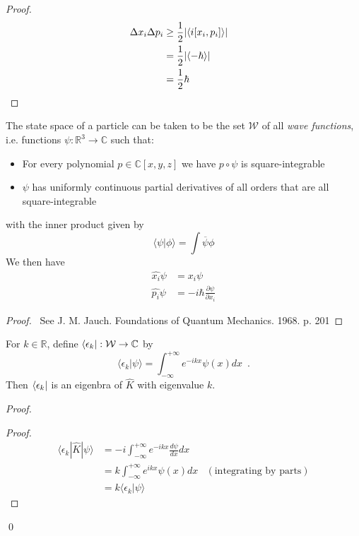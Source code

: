 \begin{proof}
\pf
\begin{align*}
\Delta x_i \Delta p_i & \geq \frac{1}{2} |\langle i [x_i, p_i] \rangle| \\
& = \frac{1}{2} |\langle - \hbar \rangle| \\
& = \frac{1}{2} \hbar & \qed
\end{align*}
\end{proof}

\begin{thm}
The state space of a particle can be taken to be the set $\mathcal{W}$ of all \emph{wave functions}, i.e. functions $\psi : \mathbb{R}^3 \rightarrow \mathbb{C}$ such that:
\begin{itemize}
\item For every polynomial $p \in \mathbb{C}[x,y,z]$ we have $p \circ \psi$ is square-integrable
\item $\psi$ has uniformly continuous partial derivatives of all orders that are all square-integrable
\end{itemize}
with the inner product given by
\[ \langle \psi | \phi \rangle = \int \overline{\psi} \phi \]
We then have
\begin{align*}
\hat{x_i} \psi & = x_i \psi \\
\hat{p_i} \psi & = - i \hbar \frac{\partial \psi}{\partial x_i}
\end{align*}
\end{thm}

\begin{proof}
\pf\ See J. M. Jauch. Foundations of Quantum Mechanics. 1968. p. 201
\end{proof}

\begin{prop}
For $k \in \mathbb{R}$, define $\bra{\epsilon_k} : \mathcal{W} \rightarrow \mathbb{C}$ by
\[ \langle \epsilon_k | \psi \rangle = \int_{- \infty}^{+ \infty} e^{-ikx} \psi(x) dx \enspace . \]
Then $\bra{\epsilon_k}$ is an eigenbra of $\hat{K}$ with eigenvalue $k$.
\end{prop}

\begin{proof}
\pf
{}
\begin{proof}
\pf
\begin{align*}
\langle \epsilon_k | \hat{K} | \psi \rangle
& = - i \int_{- \infty}^{+ \infty} e^{-ikx} \frac{d\psi}{dx} dx \\
& = k \int_{-\infty}^{+ \infty} e^{ikx} \psi(x) dx & (\text{integrating by parts}) \\
& = k \langle \epsilon_k | \psi \rangle
\end{align*}
\end{proof}
\qed
\end{proof}

